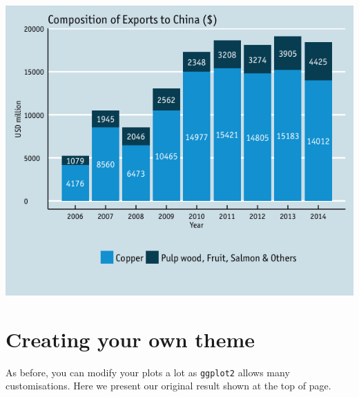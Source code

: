\begin{center}\includegraphics[width=0.55\linewidth]{0_all_posts_pdf/bar_11-1} \end{center}

\section{Creating your own theme}\label{creating-your-own-theme-2}

As before, you can modify your plots a lot as \texttt{ggplot2} allows
many customisations. Here we present our original result shown at the
top of page.

